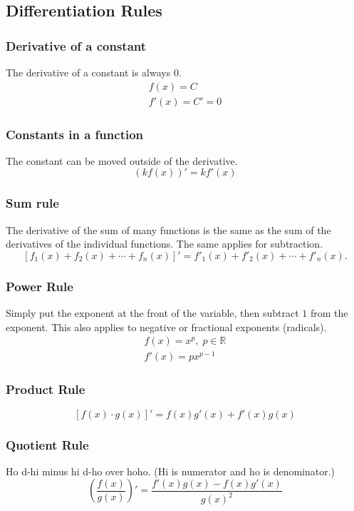 \documentclass[12pt]{article}
\begin{document}
\subsection{Differentiation Rules}
\subsubsection{Derivative of a constant}
\noindent The derivative of a constant is always $0$.
\begin{gather*}
    f(x) = C \\
    f'(x) = C' = 0
\end{gather*}

\subsubsection{Constants in a function}
\noindent The constant can be moved outside of the derivative.
\[ \left( k f(x) \right)' = k f'(x) \]

\subsubsection{Sum rule}
The derivative of the sum of many functions is the same as the sum of the derivatives of the individual functions. The same applies for subtraction.
\[ \left[ f_1(x) + f_2(x) + \cdots + f_n(x) \right]' = f'_1(x) + f'_2(x) + \cdots + f'_n(x). \]

\subsubsection{Power Rule}
Simply put the exponent at the front of the variable, then subtract $1$ from the exponent. This also applies to negative or fractional exponents (radicals).
\begin{gather*}
    f(x) = x^p, \; p \in \mathbb{R} \\
    f'(x) = px^{p-1}
\end{gather*}

\subsubsection{Product Rule}
\[ \left[ f(x) \cdot g(x) \right]' = f(x)g'(x) + f'(x)g(x) \]

\subsubsection{Quotient Rule}
\noindent Ho d-hi minus hi d-ho over hoho. (Hi is numerator and ho is denominator.)
\[ \left( \frac{f(x)}{g(x)} \right)' = \frac{f'(x)g(x) - f(x)g'(x)}{g(x)^2} \]
\end{document}
